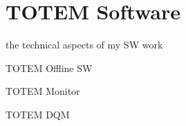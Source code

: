 \chapter{TOTEM Software}

\> the technical aspects of my SW work

\> TOTEM Offline SW

\> TOTEM Monitor

\> TOTEM DQM
